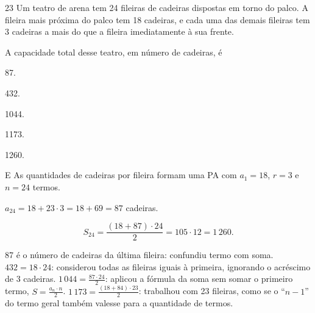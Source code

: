 \begin{questaoinedita}{2}{3}
Um teatro de arena tem 24 fileiras de cadeiras dispostas em torno do palco. A
fileira mais próxima do palco tem 18 cadeiras, e cada uma das demais fileiras
tem 3 cadeiras a mais do que a fileira imediatamente à sua frente.

A capacidade total desse teatro, em número de cadeiras, é
\begin{alternativas*}[5]
  \item 87.
  \item 432.
  \item \num{1044}.
  \item \num{1173}.
  \item \num{1260}.
\end{alternativas*}
\end{questaoinedita}
\begin{resolucao}{E}
 As quantidades de cadeiras por fileira formam uma PA com
$a_1 = 18$, $r = 3$ e $n = 24$ termos.

 $a_{24} = 18 + 23 \cdot 3 = 18 + 69 = 87$ cadeiras.

\[
S_{24} = \frac{(18 + 87)\cdot 24}{2} = 105 \cdot 12 = 1\,260 .
\]


\begin{distratores}
 87 é o número de cadeiras da última fileira: confundiu termo com soma.
 $432 = 18 \cdot 24$: considerou todas as fileiras iguais à primeira,
ignorando o acréscimo de 3 cadeiras.
 $1\,044 = \frac{87 \cdot 24}{2}$: aplicou a fórmula da soma sem somar o
primeiro termo, $S = \frac{a_n \cdot n}{2}$.
 $1\,173 = \frac{(18 + 84)\cdot 23}{2}$: trabalhou com 23 fileiras, como
se o “$n - 1$” do termo geral também valesse para a quantidade de termos.
\end{distratores}
\end{resolucao}

